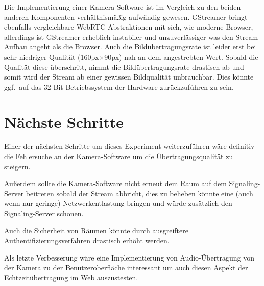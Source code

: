 \documentclass{article}
\begin{document}
\begin{onecolumn}
Die Implementierung einer Kamera-Software ist im Vergleich zu den beiden
anderen Komponenten verhältnismäßig aufwändig gewesen. GStreamer bringt
ebenfalls vergleichbare WebRTC-Abstraktionen mit sich, wie moderne Browser,
allerdings ist GStreamer erheblich instabiler und unzuverlässiger was den
Stream-Aufbau angeht als die Browser. Auch die Bildübertragungsrate ist leider
erst bei sehr niedriger Qualität (160px$\times$90px) nah an dem angestrebten
Wert. Sobald die Qualität diese überschritt, nimmt die Bildübertragungsrate
drastisch ab und somit wird der Stream ab einer gewissen Bildqualität
unbrauchbar. Dies könnte ggf.\ auf das 32-Bit-Betriebssystem der Hardware
zurückzuführen zu sein.


\section{Nächste Schritte}

Einer der nächsten Schritte um dieses Experiment weiterzuführen wäre
definitiv die Fehlersuche an der Kamera-Software um die
Übertragungsqualität zu steigern.

Außerdem sollte die Kamera-Software nicht erneut dem Raum auf dem
Signaling-Server beitreten sobald der Stream abbricht, dies zu beheben könnte
eine (auch wenn nur geringe) Netzwerkentlastung bringen und würde zusätzlich
den Signaling-Server schonen.

Auch die Sicherheit von Räumen könnte durch ausgreiftere
Authentifizierungsverfahren drastisch erhöht werden.

Als letzte Verbesserung wäre eine Implementierung von Audio-Übertragung von der
Kamera zu der Benutzeroberfläche interessant um auch diesen Aspekt der
Echtzeitübertragung im Web auszustesten.



\nocite{*}




\end{onecolumn}
\end{document}
